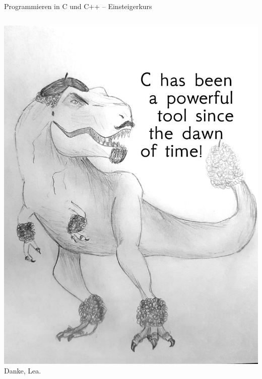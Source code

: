 \begin{frame}{Programmieren in C und C++ -- Einsteigerkurs}
\begin{columns}[T]
\includegraphics[width=\linewidth]{./gfx/T-Pudel-C}\newline
\tiny Danke, Lea.
\end{columns}
%
\end{frame}


